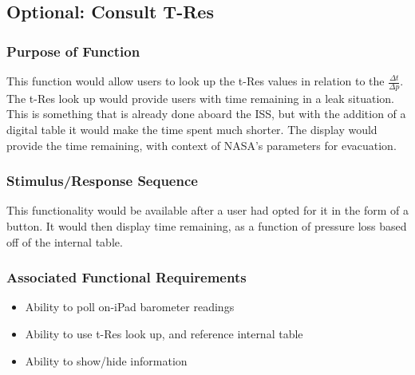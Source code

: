 \documentclass[onecolumn, draftclsnofoot,10pt, compsoc]{IEEEtran}
\begin{document}
\subsection{Optional: Consult T-Res}
\subsubsection{Purpose of Function}
This function would allow users to look up the t-Res values in relation to the $\frac{\Delta t}{\Delta p}$.
The t-Res look up would provide users with time remaining in a leak situation.
This is something that is already done aboard the ISS, but with the addition of a digital table it would make the time spent much shorter.
The display would provide the time remaining, with context of NASA's parameters for evacuation.
\subsubsection{Stimulus/Response Sequence}
This functionality would be available after a user had opted for it in the form of a button.
It would then display time remaining, as a function of pressure loss based off of the internal table.
\subsubsection{Associated Functional Requirements}
\begin{itemize}
\item Ability to poll on-iPad barometer readings
\item Ability to use t-Res look up, and reference internal table
\item Ability to show/hide information
\end{itemize}
\end{document}
